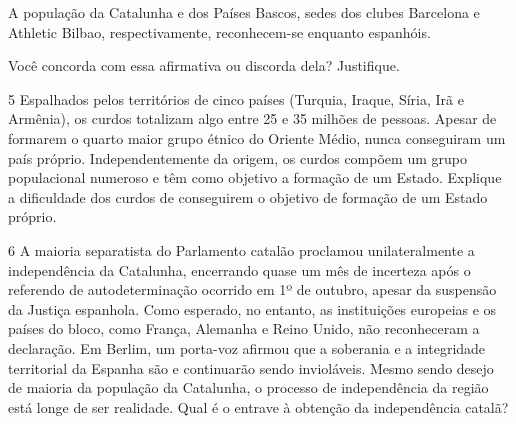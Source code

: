 
A população da Catalunha e dos Países Bascos, sedes dos clubes Barcelona
e Athletic Bilbao, respectivamente, reconhecem-se enquanto espanhóis.

Você concorda com essa afirmativa ou discorda dela? Justifique.


\num{5} Espalhados pelos territórios de cinco países (Turquia, Iraque,
Síria, Irã e Armênia), os curdos totalizam algo entre 25 e 35 milhões de
pessoas. Apesar de formarem o quarto maior grupo étnico do Oriente
Médio, nunca conseguiram um país próprio. Independentemente da origem,
os curdos compõem um grupo populacional numeroso e têm como objetivo a
formação de um Estado. Explique a dificuldade dos curdos de conseguirem
o objetivo de formação de um Estado próprio.


\num{6} A maioria separatista do Parlamento catalão proclamou
unilateralmente a independência da Catalunha, encerrando quase um mês de
incerteza após o referendo de autodeterminação ocorrido em 1º de
outubro, apesar da suspensão da Justiça espanhola. Como esperado, no
entanto, as instituições europeias e os países do bloco, como França,
Alemanha e Reino Unido, não reconheceram a declaração. Em Berlim, um
porta-voz afirmou que a soberania e a integridade territorial da Espanha
são e continuarão sendo invioláveis. Mesmo sendo desejo de maioria da
população da Catalunha, o processo de independência da região está longe
de ser realidade. Qual é o entrave à obtenção da independência catalã?

